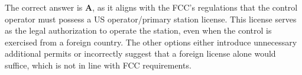 The correct answer is \textbf{A}, as it aligns with the FCC's regulations that the control operator must possess a US operator/primary station license. This license serves as the legal authorization to operate the station, even when the control is exercised from a foreign country. The other options either introduce unnecessary additional permits or incorrectly suggest that a foreign license alone would suffice, which is not in line with FCC requirements.

